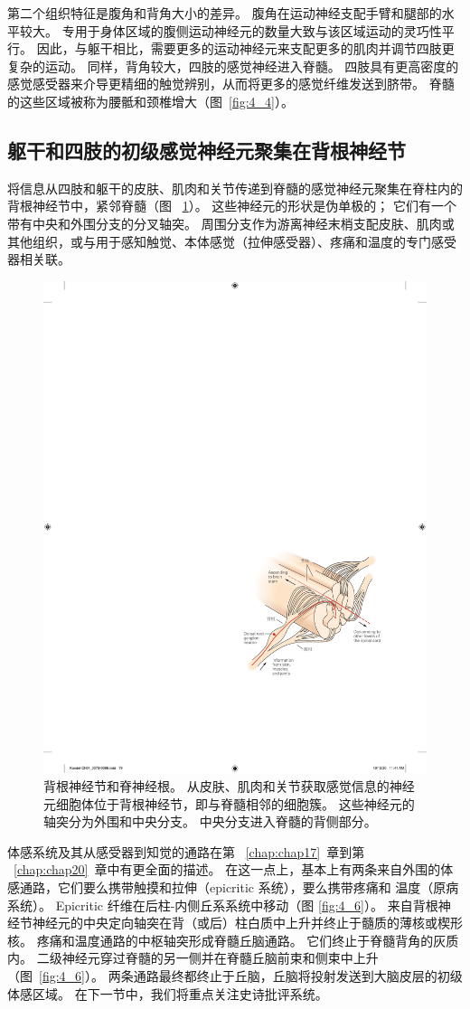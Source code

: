 第二个组织特征是腹角和背角大小的差异。
腹角在运动神经支配手臂和腿部的水平较大。
专用于身体区域的腹侧运动神经元的数量大致与该区域运动的灵巧性平行。
因此，与躯干相比，需要更多的运动神经元来支配更多的肌肉并调节四肢更复杂的运动。
同样，背角较大，四肢的感觉神经进入脊髓。
四肢具有更高密度的感觉感受器来介导更精细的触觉辨别，从而将更多的感觉纤维发送到脐带。
脊髓的这些区域被称为腰骶和颈椎增大（图~\ref{fig:4_4}）。



\subsection{躯干和四肢的初级感觉神经元聚集在背根神经节}

将信息从四肢和躯干的皮肤、肌肉和关节传递到脊髓的感觉神经元聚集在脊柱内的背根神经节中，紧邻脊髓（图 ~\ref{fig:4_5}）。 
这些神经元的形状是伪单极的；
它们有一个带有中央和外围分支的分叉轴突。
周围分支作为游离神经末梢支配皮肤、肌肉或其他组织，或与用于感知触觉、本体感觉（拉伸感受器）、疼痛和温度的专门感受器相关联。


\begin{figure}[htbp]
	\centering
	\includegraphics[width=0.5\linewidth]{chap04/fig_4_5}
	\caption{背根神经节和脊神经根。 
		从皮肤、肌肉和关节获取感觉信息的神经元细胞体位于背根神经节，即与脊髓相邻的细胞簇。 
		这些神经元的轴突分为外围和中央分支。 
		中央分支进入脊髓的背侧部分。}
	\label{fig:4_5}
\end{figure}


体感系统及其从感受器到知觉的通路在第 ~\ref{chap:chap17}~章到第 ~\ref{chap:chap20}~章中有更全面的描述。
在这一点上，基本上有两条来自外围的体感通路，它们要么携带触摸和拉伸（epicritic 系统），要么携带疼痛和 温度（原病系统）。
Epicritic 纤维在后柱-内侧丘系系统中移动（图 \ref{fig:4_6}）。
来自背根神经节神经元的中央定向轴突在背（或后）柱白质中上升并终止于髓质的薄核或楔形核。
疼痛和温度通路的中枢轴突形成脊髓丘脑通路。
它们终止于脊髓背角的灰质内。
二级神经元穿过脊髓的另一侧并在脊髓丘脑前束和侧束中上升（图~\ref{fig:4_6}）。 
两条通路最终都终止于丘脑，丘脑将投射发送到大脑皮层的初级体感区域。
在下一节中，我们将重点关注史诗批评系统。



